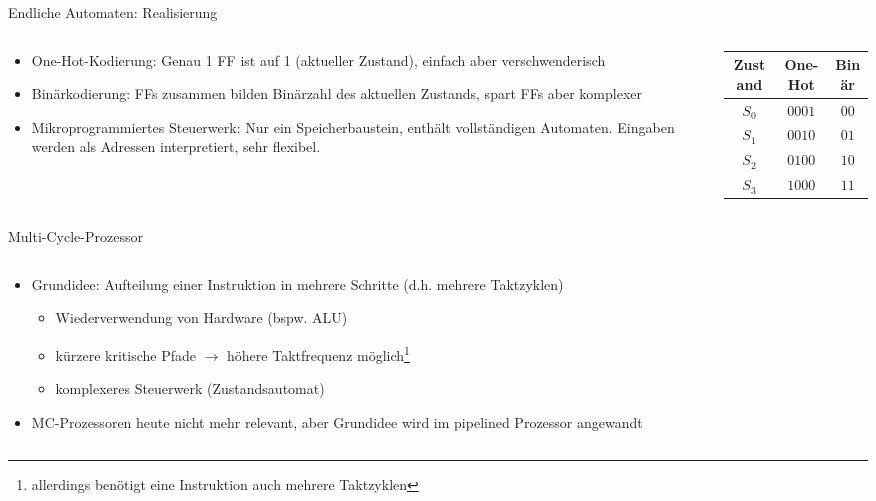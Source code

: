 \begin{frame}[fragile, c]{Endliche Automaten: Realisierung}{}
	\begin{columns}[c]
		\begin{column}{0.5\textwidth}
			\begin{itemize}
				\item One-Hot-Kodierung: Genau 1 FF ist auf 1 (aktueller Zustand), einfach aber verschwenderisch
				\item Binärkodierung: FFs zusammen bilden Binärzahl des aktuellen Zustands, spart FFs aber komplexer
				\item Mikroprogrammiertes Steuerwerk: Nur ein Speicherbaustein, enthält vollständigen Automaten. Eingaben werden als Adressen interpretiert, sehr flexibel.
			\end{itemize}
		\end{column}
		\begin{column}{0.5\textwidth}
			\begin{table}[]
				\begin{tabular}{c|c|c}
					Zustand & One-Hot & Binär \\ \hline
					$S_0$   & $0001$  & $00$  \\
					$S_1$   & $0010$  & $01$  \\
					$S_2$   & $0100$  & $10$  \\
					$S_3$   & $1000$  & $11$
				\end{tabular}
			\end{table}
		\end{column}
	\end{columns}
\end{frame}


\begin{frame}[c, fragile]{Multi-Cycle-Prozessor}{}
	\begin{columns}[c]
		\begin{column}{0.6\textwidth}
			\begin{itemize}
				\item Grundidee: Aufteilung einer Instruktion in mehrere Schritte (d.h. mehrere Taktzyklen)
				      \begin{itemize}
					      \item Wiederverwendung von Hardware (bspw. ALU)
					      \item kürzere kritische Pfade $\rightarrow$ höhere Taktfrequenz möglich\footnote[frame]{allerdings benötigt eine Instruktion auch mehrere Taktzyklen}
					      \item komplexeres Steuerwerk (Zustandsautomat)
				      \end{itemize}
				\item MC-Prozessoren heute nicht mehr relevant, aber Grundidee wird im pipelined Prozessor angewandt
			\end{itemize}
		\end{column}%
	\end{columns}
\end{frame}

